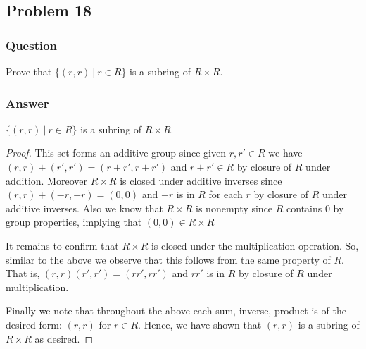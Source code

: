 \documentclass[12pt]{article}
\begin{document}
\subsection{Problem 18}

\subsubsection{Question}
Prove that $\{ (r,r) \ |\ r\in R\}$ is a subring of $R \times R$.
\subsubsection{Answer}

 $\{ (r,r) \ |\ r\in R\}$ is a subring of $R \times R$.
 \begin{proof}
 This set forms an additive group since given $r,r' \in R$ we have $(r,r)+(r',r')=(r+r',r+r')$ and $r+r' \in R$ by closure of $R$ under addition. Moreover $R \times R$ is closed under additive inverses since $(r,r)+(-r,-r)=(0,0)$ and $-r$ is in $R$ for each $r$ by closure of $R$ under additive inverses. Also we know that $R \times R$ is nonempty since $R$ contains $0$ by group properties, implying that $(0,0)\in R \times R$ 
 
 It remains to confirm that $R \times R$ is closed under the multiplication operation. So, similar to the above we observe that this follows from the same property of $R$. That is, $(r,r)(r',r')=(rr',rr')$ and $rr'$ is in $R$ by closure of $R$ under multiplication. 
 
 Finally we note that throughout the above each sum, inverse, product is of the desired form: $(r,r)$ for $r \in R$. Hence, we have shown that $(r,r)$ is a subring of $R \times R$ as desired.\end{proof}
\end{document}
